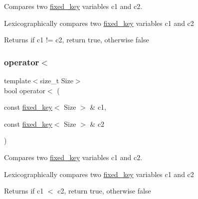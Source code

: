 Compares two \mbox{\hyperlink{classaacio_1_1fixed__key}{fixed\+\_\+key}} variables c1 and c2. 

Lexicographically compares two \mbox{\hyperlink{classaacio_1_1fixed__key}{fixed\+\_\+key}} variables c1 and c2 \begin{DoxyReturn}{Returns}
if c1 != c2, return true, otherwise false 
\end{DoxyReturn}
\mbox{\label{classaacio_1_1fixed__key_aed9cc9961cc5c84cdefa193a7baf3f9a}} 
\subsubsection{\texorpdfstring{operator$<$}{operator<}\hspace{0.1cm}{\footnotesize\ttfamily [1/2]}}
{\footnotesize\ttfamily template$<$size\+\_\+t Size$>$ \\
bool operator$<$ (\begin{DoxyParamCaption}\item[{const \mbox{\hyperlink{classaacio_1_1fixed__key}{fixed\+\_\+key}}$<$ Size $>$ \&}]{c1,  }\item[{const \mbox{\hyperlink{classaacio_1_1fixed__key}{fixed\+\_\+key}}$<$ Size $>$ \&}]{c2 }\end{DoxyParamCaption})\hspace{0.3cm}{\ttfamily [friend]}}



Compares two \mbox{\hyperlink{classaacio_1_1fixed__key}{fixed\+\_\+key}} variables c1 and c2. 

Lexicographically compares two \mbox{\hyperlink{classaacio_1_1fixed__key}{fixed\+\_\+key}} variables c1 and c2 \begin{DoxyReturn}{Returns}
if c1 $<$ c2, return true, otherwise false 
\end{DoxyReturn}
\mbox{\label{classaacio_1_1fixed__key_aed9cc9961cc5c84cdefa193a7baf3f9a}} 

